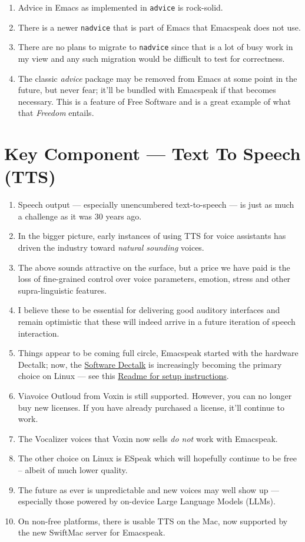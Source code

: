 \documentclass[11pt]{article}
\begin{document}
\begin{enumerate}
\item Advice in Emacs as implemented in \texttt{advice} is rock-solid.
\item There is a newer \texttt{nadvice} that is part of Emacs that Emacspeak
does not use.

\item There are no plans to migrate to \texttt{nadvice} since that is a lot of
busy work in my view and any such migration would be difficult
to test for correctness.
\item The classic \emph{advice} package may be removed from Emacs at some
point in the future, but never fear; it'll be bundled with
Emacspeak if that becomes necessary. This is a feature of Free Software and is a great
example of what that \emph{Freedom} entails.
\end{enumerate}
\section{Key Component —  Text To Speech (TTS)}
\label{sec:org63ce131}

\begin{enumerate}
\item Speech output --- especially unencumbered text-to-speech --- is just
as much a challenge as it was 30 years ago.
\item In the bigger picture, early instances of using TTS for voice
assistants has driven the industry toward \emph{natural sounding} voices.
\item The above sounds attractive on the surface, but a price we have
paid is the  loss of fine-grained control over voice parameters,
emotion, stress and other supra-linguistic features.
\item I  believe  these to be essential for delivering
good auditory interfaces and   remain optimistic that
these will indeed arrive in a future iteration of speech
interaction.
\item Things appear to be coming full circle, Emacspeak started with
the hardware Dectalk; now, the \href{https://github.com/dectalk/dectalk.git}{Software Dectalk} is increasingly
becoming the primary choice on Linux --- see this  \href{https://raw.githubusercontent.com/tvraman/emacspeak/master/servers/software-dtk/Readme.org}{Readme for setup instructions}.
\item Viavoice Outloud from Voxin is still supported.  However,
you can no longer buy new licenses. If you have already purchased
a license, it'll
continue to work.
\item The  Vocalizer voices that Voxin now sells \emph{do not} work with Emacspeak.
\item The  other choice on Linux is ESpeak which will hopefully
continue to be free -- albeit of much lower quality.
\item The future as ever is unpredictable and new voices may well show
up --- especially those powered by on-device Large Language
Models (LLMs).

\item On non-free platforms, there is usable TTS on the Mac, now
supported by the new SwiftMac server for Emacspeak.
\end{enumerate}
\end{document}
